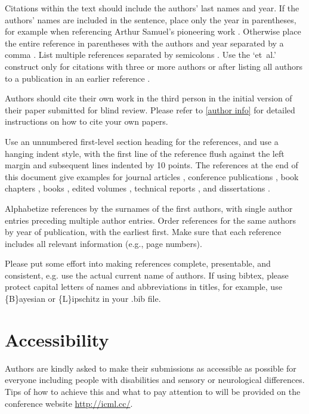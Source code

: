\documentclass{article}
\theoremstyle{plain}
\theoremstyle{definition}
\theoremstyle{remark}
\begin{document}
Citations within the text should include the authors' last names and year. If
the authors' names are included in the sentence, place only the year in
parentheses, for example when referencing Arthur Samuel's pioneering work
. Otherwise place the entire reference in parentheses with the
authors and year separated by a comma \cite{Samuel59}. List multiple references
separated by semicolons \cite{kearns89,Samuel59,mitchell80}. Use the `et~al.'
construct only for citations with three or more authors or after listing all
authors to a publication in an earlier reference \cite{MachineLearningI}.

Authors should cite their own work in the third person in the initial version
of their paper submitted for blind review. Please refer to \cref{author info}
for detailed instructions on how to cite your own papers.

Use an unnumbered first-level section heading for the references, and use a
hanging indent style, with the first line of the reference flush against the
left margin and subsequent lines indented by 10 points. The references at the
end of this document give examples for journal articles \cite{Samuel59},
conference publications \cite{langley00}, book chapters \cite{Newell81}, books
\cite{DudaHart2nd}, edited volumes \cite{MachineLearningI}, technical reports
\cite{mitchell80}, and dissertations \cite{kearns89}.

Alphabetize references by the surnames of the first authors, with single author
entries preceding multiple author entries. Order references for the same
authors by year of publication, with the earliest first. Make sure that each
reference includes all relevant information (e.g., page numbers).

Please put some effort into making references complete, presentable, and
consistent, e.g. use the actual current name of authors. If using bibtex,
please protect capital letters of names and abbreviations in titles, for
example, use \{B\}ayesian or \{L\}ipschitz in your .bib file.

\section*{Accessibility}

Authors are kindly asked to make their submissions as accessible as possible
for everyone including people with disabilities and sensory or neurological
differences. Tips of how to achieve this and what to pay attention to will be
provided on the conference website \url{http://icml.cc/}.
\end{document}
